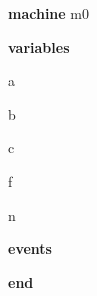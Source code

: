\begin{block}
  \item   \textbf{machine} m0
  \item   \textbf{variables}
  \begin{block}
    \item   a
    \item   b
    \item   c
    \item   f
    \item   n
  \end{block}
  \item   
  \item   
  \item   
  \item   \textbf{events}
  \begin{block}
    \item   
  \end{block}
  \item   \textbf{end} \\
\end{block}
